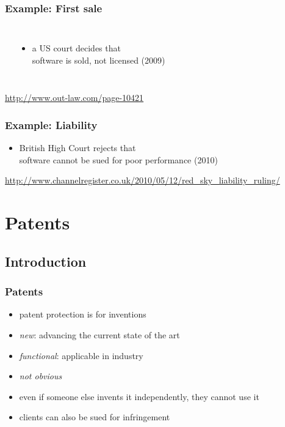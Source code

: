 \documentclass[dvipsnames]{beamer}
\theoremstyle{plain}
\begin{document}
\begin{frame}
  \frametitle{Example: First sale}

  \begin{columns}
    \begin{center}
    \end{center}

    \begin{itemize}
      \item a US court decides that\\
        software is sold, not licensed (2009)
    \end{itemize}
  \end{columns}

  \medskip
  \tiny{\url{http://www.out-law.com/page-10421}}\\
\end{frame}

\begin{frame}
  \frametitle{Example: Liability}

  \begin{center}
  \end{center}

  \begin{itemize}
    \item British High Court rejects that\\
      software cannot be sued for poor performance (2010)
  \end{itemize}

  \medskip
  \tiny{\url{http://www.channelregister.co.uk/2010/05/12/red_sky_liability_ruling/}}\\
\end{frame}

\section{Patents}

\subsection{Introduction}

\begin{frame}
  \frametitle{Patents}

  \begin{itemize}
    \item patent protection is for \alert{inventions}

    \medskip
    \item \emph{new}: advancing the current state of the art
    \item \emph{functional}: applicable in industry
    \item \emph{not obvious}

    \pause
    \medskip
    \item even if someone else invents it independently, they cannot use it
    \item clients can also be sued for infringement
  \end{itemize}
\end{frame}
\end{document}
